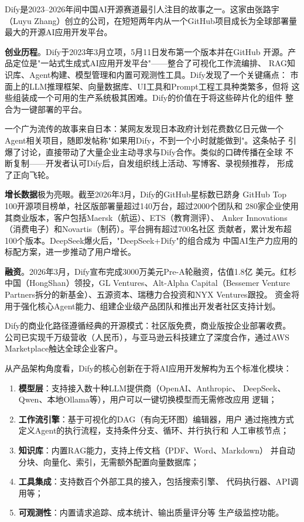 Dify是2023--2026年间中国AI开源赛道最引人注目的故事之一。这家由张路宇
（Luyu Zhang）创立的公司，在短短两年内从一个GitHub项目成长为全球部署量
最大的开源AI应用开发平台。

\textbf{创业历程}。Dify于2023年3月立项，5月11日发布第一个版本并在GitHub
开源。产品定位是"一站式生成式AI应用开发平台"——整合了可视化工作流编排、
RAG知识库、Agent构建、模型管理和内置可观测性工具。Dify发现了一个关键痛点：
市面上的LLM推理框架、向量数据库、UI工具和Prompt工程工具种类繁多，但将
这些组装成一个可用的生产系统极其困难。Dify的价值在于将这些碎片化的组件
整合为一键部署的平台。

一个广为流传的故事来自日本：某网友发现日本政府计划花费数亿日元做一个
Agent相关项目，随即发帖称"如果用Dify，不到一个小时就能做到"。这条帖子
引爆了讨论，直接带动了大量企业主动寻求与Dify合作。类似的口碑传播在全球
不断复制——开发者认可Dify后，自发组织线上活动、写博客、录视频推荐，
形成了正向飞轮。

\textbf{增长数据}极为亮眼。截至2026年3月，Dify的GitHub星标数已跻身
GitHub Top 100开源项目榜单，社区版部署量超过140万台，超过2000个团队和
280家企业使用其商业版本，客户包括Maersk（航运）、ETS（教育测评）、
Anker Innovations（消费电子）和Novartis（制药）。平台拥有超过700名社区
贡献者，累计发布超100个版本。DeepSeek爆火后，"DeepSeek+Dify"的组合成为
中国AI生产力应用的标配方案，进一步推动了用户增长。

\textbf{融资}。2026年3月，Dify宣布完成3000万美元Pre-A轮融资，估值1.8亿
美元。红杉中国（HongShan）领投，GL Ventures、Alt-Alpha Capital（Bessemer
Venture Partners拆分的新基金）、五源资本、瑞穗力合投资和NYX Ventures跟投。
资金将用于强化核心Agent能力、组建企业级产品团队和推出开发者社区支持计划。

Dify的商业化路径遵循经典的开源模式：社区版免费，商业版按企业部署收费。
公司已实现千万级营收（人民币），与亚马逊云科技建立了深度合作，通过AWS
Marketplace触达全球企业客户。

从产品架构角度看，Dify的核心创新在于将AI应用开发解构为五个标准化模块：
\begin{enumerate}
  \item \textbf{模型层}：支持接入数十种LLM提供商（OpenAI、Anthropic、
    DeepSeek、Qwen、本地Ollama等），用户可以一键切换模型而无需修改应用
    逻辑；
  \item \textbf{工作流引擎}：基于可视化的DAG（有向无环图）编辑器，用户
    通过拖拽方式定义Agent的执行流程，支持条件分支、循环、并行执行和
    人工审核节点；
  \item \textbf{知识库}：内置RAG能力，支持上传文档（PDF、Word、Markdown）
    并自动分块、向量化、索引，无需额外配置向量数据库；
  \item \textbf{工具集成}：支持数百个外部工具的接入，包括搜索引擎、
    代码执行器、API调用等；
  \item \textbf{可观测性}：内置请求追踪、成本统计、输出质量评分等
    生产级监控功能。
\end{enumerate}

